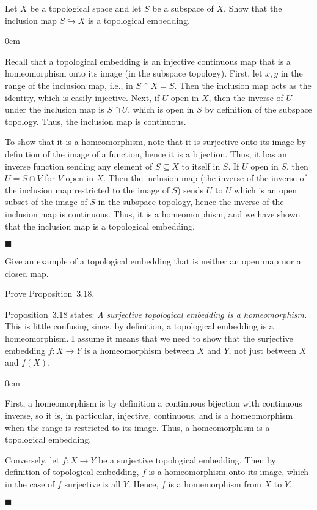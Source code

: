 \documentclass[12pt]{article}
\renewcommand{\qed}{\hfill$\blacksquare$}
\renewenvironment{proof}{\begin{addmargin}[1em]{0em}\begin{newproof}}{\end{newproof}\end{addmargin}\qed}
\newenvironment{exercise}[2][Exercise]{\begin{trivlist}
\item[\hskip \labelsep {\bfseries #1}\hskip \labelsep {\bfseries #2.}]}{\end{trivlist}}
\begin{document}
\begin{exercise}{3.13}
Let $X$ be a topological space and let $S$ be a subspace of $X$. Show that the inclusion map $S\hookrightarrow X$ is a topological embedding.
\end{exercise}
\begin{proof}
Recall that a topological embedding is an injective continuous map that is a homeomorphism onto its image (in the subspace topology). First, let $x,y$ in the range of the inclusion map, i.e., in $S\cap X = S$. Then the inclusion map acts as the identity, which is easily injective. Next, if $U$ open in $X$, then the inverse of $U$ under the inclusion map is $S\cap U$, which is open in $S$ by definition of the subspace topology. Thus, the inclusion map is continuous.

To show that it is a homeomorphism, note that it is surjective onto its image by definition of the image of a function, hence it is a bijection. Thus, it has an inverse function sending any element of $S\subseteq X$ to itself in $S$. If $U$ open in $S$, then $U=S\cap V$ for $V$ open in $X$. Then the inclusion map (the inverse of the inverse of the inclusion map restricted to the image of $S$) sends $U$ to $U$ which is an open subset of the image of $S$ in the subspace topology, hence the inverse of the inclusion map is continuous. Thus, it is a homeomorphism, and we have shown that the inclusion map is a topological embedding.
\end{proof}





\begin{exercise}{3.17}
Give an example of a topological embedding that is neither an open map nor a closed map.
\end{exercise}

\begin{exercise}{3.19}
Prove Proposition~3.18.
\end{exercise}
Proposition~3.18 states:
\textit{ A surjective topological embedding is a homeomorphism.} \\
{\color{red} This is little confusing since, by definition, a topological embedding is a homeomorphism. I assume it means that we need to show that the surjective embedding $f:X\rightarrow Y$ is a homeomorphism between $X$ and $Y$, not just between $X$ and $f\left(X\right)$.} \\
\begin{proof}
First, a homeomorphism is by definition a continuous bijection with continuous inverse, so it is, in particular, injective, continuous, and is a homeomorphism when the range is restricted to its image. Thus, a homeomorphism is a topological embedding.

Conversely, let $f:X\rightarrow Y$ be a surjective topological embedding. Then by definition of topological embedding, $f$ is a homeomorphism onto its image, which in the case of $f$ surjective is all $Y$. Hence, $f$ is a homemorphism from $X$ to $Y$. 
\end{proof}
\end{document}
